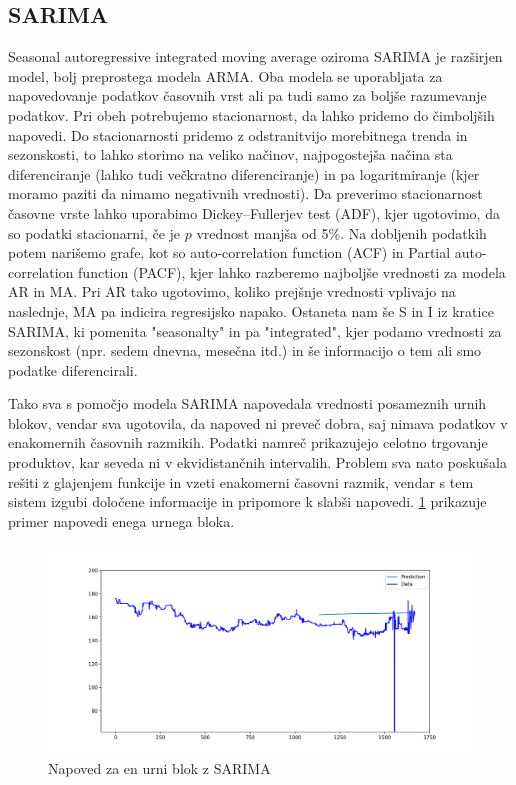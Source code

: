 \documentclass[12pt,a4paper]{amsart}
\theoremstyle{definition} %
\theoremstyle{plain} %
\begin{document}
\subsection{SARIMA}

Seasonal autoregressive integrated moving average oziroma SARIMA je razširjen model, bolj preprostega modela ARMA. Oba modela se uporabljata za napovedovanje podatkov časovnih vrst ali pa tudi samo za boljše razumevanje podatkov. Pri obeh potrebujemo stacionarnost, da lahko pridemo do čimboljših napovedi. 
Do stacionarnosti pridemo z odstranitvijo morebitnega trenda in sezonskosti, to lahko storimo na veliko načinov, najpogostejša načina sta diferenciranje (lahko tudi večkratno diferenciranje) in pa logaritmiranje (kjer moramo paziti da nimamo negativnih vrednosti).
Da preverimo stacionarnost časovne vrste lahko uporabimo Dickey–Fullerjev test (ADF), kjer ugotovimo, da so podatki stacionarni, če je $p$ vrednost manjša od 5\%. Na dobljenih podatkih potem narišemo grafe, kot so auto-correlation function (ACF) in Partial auto-correlation function (PACF), kjer lahko razberemo najboljše vrednosti 
za modela AR in MA. Pri AR tako ugotovimo, koliko prejšnje vrednosti vplivajo na naslednje, MA pa indicira regresijsko napako. Ostaneta nam še S in I iz kratice SARIMA, ki pomenita "seasonalty" in pa "integrated", kjer podamo vrednosti za sezonskost (npr. sedem dnevna, mesečna itd.) in še informacijo o tem ali smo podatke diferencirali.


Tako sva s pomočjo modela SARIMA napovedala vrednosti posameznih urnih blokov, vendar sva ugotovila, da napoved ni preveč dobra, saj nimava podatkov v enakomernih časovnih razmikih. Podatki namreč prikazujejo celotno trgovanje produktov, kar seveda ni v ekvidistančnih intervalih. 
Problem sva nato poskušala rešiti z glajenjem funkcije in vzeti enakomerni časovni razmik, vendar s tem sistem izgubi določene informacije in pripomore k slabši napovedi.
\ref{fig:Arima} prikazuje primer napovedi enega urnega bloka.

\begin{figure}[h]
    \centering
    \includegraphics[scale=0.45]{Arima.png}
    \caption{Napoved za en urni blok z SARIMA}
    \label{fig:Arima}
\end{figure}
\end{document}
